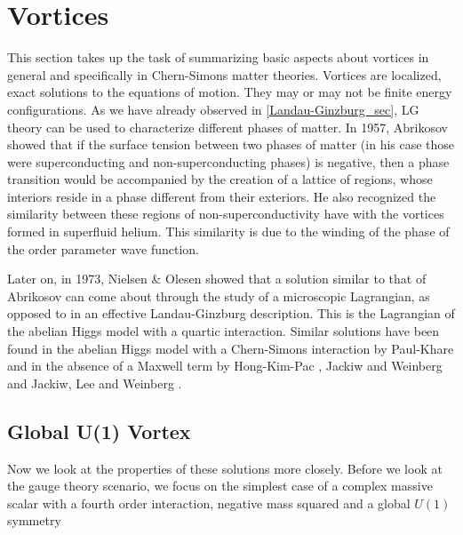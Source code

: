         \section{Vortices} \label{vortices_sec}
        This section takes up the task of summarizing basic aspects about vortices in general and specifically in Chern-Simons matter theories.
        Vortices are localized, exact solutions to the equations of motion. They may or may not be finite energy configurations.
        As we have already observed in \ref{Landau-Ginzburg_sec}, LG theory can be used to characterize different phases of matter. In 1957, Abrikosov showed that if the surface tension between two phases of matter (in his case those were superconducting and non-superconducting phases) is negative, then a phase transition would be accompanied by the creation of a lattice of regions, whose interiors reside in a phase different from their exteriors. He also recognized the similarity between these regions of non-superconductivity have with the vortices formed in superfluid helium. This similarity is due to the winding of the phase of the order parameter wave function.

        Later on, in 1973, Nielsen \& Olesen \cite{Nielsen1973} showed that a solution similar to that of Abrikosov can come about through the study of a microscopic Lagrangian, as opposed to in an effective Landau-Ginzburg description. This is the Lagrangian of the abelian Higgs model with a quartic interaction. Similar solutions have been found in the abelian Higgs model with a Chern-Simons interaction by Paul-Khare \cite{Paul1986} and in the absence of a Maxwell term by Hong-Kim-Pac \cite{Hong1990}, Jackiw and Weinberg \cite{Jackiw1990a} and Jackiw, Lee and Weinberg \cite{Jackiw1990b}.

        \subsection{Global U(1) Vortex}

        Now we look at the properties of these solutions more closely. Before we look at the gauge theory scenario, we focus on the simplest case of a complex massive scalar with a fourth order interaction, negative mass squared and a global $U(1)$ symmetry

